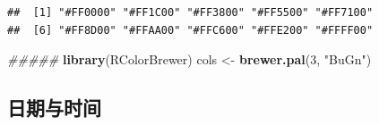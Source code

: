 \documentclass[
]{book}
\newenvironment{Shaded}{\begin{snugshade}}{\end{snugshade}}
\newcommand{\CommentTok}[1]{\textcolor[rgb]{0.56,0.35,0.01}{\textit{#1}}}
\newcommand{\DecValTok}[1]{\textcolor[rgb]{0.00,0.00,0.81}{#1}}
\newcommand{\KeywordTok}[1]{\textcolor[rgb]{0.13,0.29,0.53}{\textbf{#1}}}
\newcommand{\NormalTok}[1]{#1}
\newcommand{\StringTok}[1]{\textcolor[rgb]{0.31,0.60,0.02}{#1}}
\begin{document}
\begin{verbatim}
##  [1] "#FF0000" "#FF1C00" "#FF3800" "#FF5500" "#FF7100"
##  [6] "#FF8D00" "#FFAA00" "#FFC600" "#FFE200" "#FFFF00"
\end{verbatim}

\begin{Shaded}
\begin{Highlighting}[]
\CommentTok{#####}
\KeywordTok{library}\NormalTok{(RColorBrewer)}
\NormalTok{cols <-}\StringTok{ }\KeywordTok{brewer.pal}\NormalTok{(}\DecValTok{3}\NormalTok{, }\StringTok{"BuGn"}\NormalTok{)}
\end{Highlighting}
\end{Shaded}

\hypertarget{ux65e5ux671fux4e0eux65f6ux95f4}{%
\subsection{日期与时间}\label{ux65e5ux671fux4e0eux65f6ux95f4}}
\end{document}
